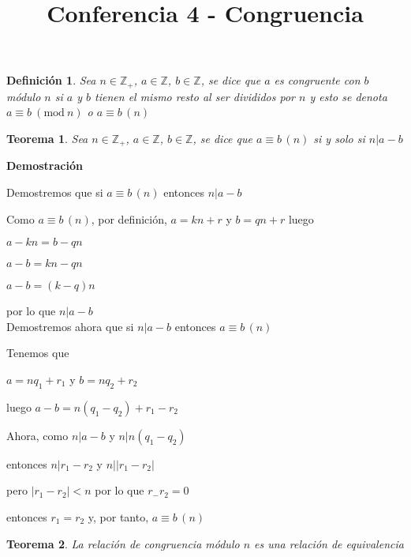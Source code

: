 \documentclass[a4paper,12pt]{report}
\title{Conferencia 4 - Congruencia}
\author{}
\newtheorem*{teo}{Teorema}
\newtheorem*{dfn}{Definición}
\begin{document}
\maketitle


\begin{dfn}
 Sea $n\in \mathbb{Z}_+$, $a\in \mathbb{Z}$, $b\in \mathbb{Z}$, se dice que $a$ es congruente con $b$ módulo $n$ si $a$ y $b$ tienen el mismo resto al ser divididos por $n$ y esto se denota $ a\equiv b \ (\textrm{mod}\ n)$ o $a\equiv b\, (n)$
\end{dfn}

\begin{teo}
 Sea $n\in \mathbb{Z}_+$, $a\in \mathbb{Z}$, $b\in \mathbb{Z}$, se dice que $a \equiv b \, (n)$ si y solo si $n|a-b$
\end{teo}

\textbf{Demostración}

Demostremos que si $a\equiv b\, (n)$ entonces $n|a-b$

Como $a\equiv b\, (n)$, por definición, $a=kn+r$ y $b=qn+r$  luego 

$a-kn=b-qn$ 

$a-b=kn-qn$

$a-b=(k-q)n$

por lo que $n|a-b$
\\

Demostremos ahora que si $n|a-b$ entonces $a\equiv b\, (n)$

Tenemos que 

$a=nq_1+r_1$ y $b=nq_2+r_2$

luego $a-b=n(q_1-q_2) + r_1 - r_2$

Ahora, como $n|a-b$ y $n|n(q_1-q_2)$

entonces $n|r_1-r_2$ y $n||r_1-r_2|$

pero $|r_1-r_2|<n$ por lo que $r_-r_2=0$

entonces $r_1=r_2$ y, por tanto, $a\equiv b\, (n)$

\begin{teo}
 La relación de congruencia módulo $n$ es una relación de equivalencia
\end{teo}
\end{document}
